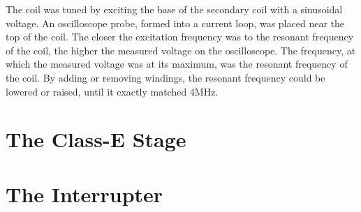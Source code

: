 The coil was tuned by exciting the base of the secondary coil with a sinusoidal voltage. An oscilloscope probe, formed into a current loop, was placed near the top of the coil. The closer the excitation frequency was to the resonant frequency of the coil, the higher the measured voltage on the oscilloscope. The frequency, at which the measured voltage was at its maximum, was the resonant frequency of the coil. By adding or removing windings, the resonant frequency could be lowered or raised, until it exactly matched 4MHz.

\section{The Class-E Stage}

\section{The Interrupter}